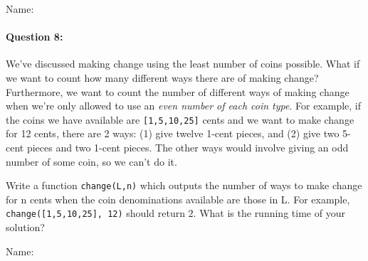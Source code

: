 \documentclass[11pt]{article}
\begin{document}
\newpage

\noindent Name:

\paragraph{Question 8:}
We've discussed making change using the least number of coins
possible.  What if we want to count how many different ways there are
of making change?  
Furthermore, we want to count the number of different ways of making
change when we're only allowed to use an {\em even number of each coin
  type}.
For example, if the coins we have available are
\texttt{[1,5,10,25]} cents and we want to make change for 12 cents, there are 2
ways: (1) give twelve 1-cent pieces,  and (2) give two 5-cent pieces and
two 1-cent pieces.  The other ways would involve giving an odd number
of some coin, so we can't do it.

Write a function \texttt{change(L,n)} which outputs the number of
ways to make change for n cents when the coin denominations available
are those in L.  For example, \texttt{change([1,5,10,25], 12)} should
return $2$.  What is the running time of your solution?  

\newpage

\noindent Name:
\end{document}
